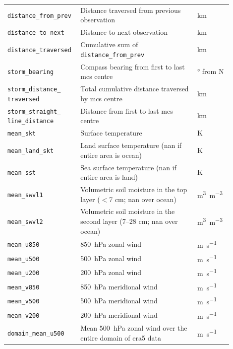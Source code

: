 {\begin{longtable}{>{\raggedright\arraybackslash}p{0.25\linewidth} p{0.50\linewidth} >{\raggedright\arraybackslash}p{0.15\linewidth}}
    \texttt{distance\_from\_prev} & Distance traversed from previous observation & \unit{\km} \\
    \texttt{distance\_to\_next} & Distance to next observation & \unit{\km} \\
    \texttt{distance\_traversed} & Cumulative sum of \texttt{distance\_from\_prev} & \unit{\km} \\
    \texttt{storm\_bearing} & Compass bearing from first to last \acrshort{mcs} centre & \unit{\degree} from  N \\
    \texttt{storm\_distance\_ traversed} & Total cumulative distance traversed by \acrshort{mcs} centre & \unit{\km} \\
    \texttt{storm\_straight\_ line\_distance} & Distance from first to last \acrshort{mcs} centre & \unit{\km} \\
    \texttt{mean\_skt} & Surface temperature & \unit{\kelvin} \\
    \texttt{mean\_land\_skt} & Land surface temperature (\acrshort{nan} if entire area is ocean) & \unit{\kelvin} \\
    \texttt{mean\_sst} & Sea surface temperature (\acrshort{nan} if entire area is land) & \unit{\kelvin} \\
    \texttt{mean\_swvl1} & Volumetric soil moisture in the top layer ($<$7 cm; \acrshort{nan} over ocean) & \unit{\meter\cubed\per\meter\cubed} \\
    \texttt{mean\_swvl2} & Volumetric soil moisture in the second layer (7--28 cm; \acrshort{nan} over ocean) & \unit{\meter\cubed\per\meter\cubed} \\
    \texttt{mean\_u850} & \SI{850}{\hecto\pascal} zonal wind & \unit{\meter\per\second} \\
    \texttt{mean\_u500} & \SI{500}{\hecto\pascal} zonal wind & \unit{\meter\per\second} \\
    \texttt{mean\_u200} & \SI{200}{\hecto\pascal} zonal wind & \unit{\meter\per\second} \\
    \texttt{mean\_v850} & \SI{850}{\hecto\pascal} meridional wind & \unit{\meter\per\second} \\
    \texttt{mean\_v500} & \SI{500}{\hecto\pascal} meridional wind & \unit{\meter\per\second} \\
    \texttt{mean\_v200} & \SI{200}{\hecto\pascal} meridional wind & \unit{\meter\per\second} \\
    \texttt{domain\_mean\_u500} & Mean \SI{500}{\hecto\pascal} zonal wind over the entire domain of \acrshort{era5} data & \unit{\meter\per\second} \\

\end{longtable}}
